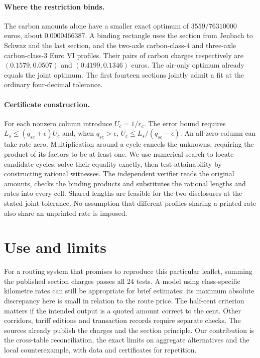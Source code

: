 \documentclass[11pt]{article}
\begin{document}
\paragraph{Where the restriction binds.}
The carbon amounts alone have a smaller exact optimum of $3559/76310000$ euros, about 0.0000466387. A binding rectangle uses the section from Jenbach to Schwaz and the last section, and the two-axle carbon-class-4 and three-axle carbon-class-3 Euro VI profiles. Their pairs of carbon charges respectively are $(0.1579,0.0507)$ and $(0.4199,0.1346)$ euros. The air-only optimum already equals the joint optimum. The first fourteen sections jointly admit a fit at the ordinary four-decimal tolerance.

\paragraph{Certificate construction.}
For each nonzero column introduce $U_c=1/r_c$. The error bound requires $L_s\leq(q_{sc}+\epsilon)U_c$ and, when $q_{sc}>\epsilon$, $U_c\leq L_s/(q_{sc}-\epsilon)$. An all-zero column can take rate zero. Multiplication around a cycle cancels the unknowns, requiring the product of its factors to be at least one. We use numerical search to locate candidate cycles, solve their equality exactly, then test attainability by constructing rational witnesses. The independent verifier reads the original amounts, checks the binding products and substitutes the rational lengths and rates into every cell. Shared lengths are feasible for the two disclosures at the stated joint tolerance. No assumption that different profiles sharing a printed rate also share an unprinted rate is imposed.
\section{Use and limits}
For a routing system that promises to reproduce this particular leaflet, summing the published section charges passes all 24 tests. A model using class-specific kilometre rates can still be appropriate for brief estimates: its maximum absolute discrepancy here is small in relation to the route price. The half-cent criterion matters if the intended output is a quoted amount correct to the cent. Other corridors, tariff editions and transaction records require separate checks. The sources already publish the charges and the section principle. Our contribution is the cross-table reconciliation, the exact limits on aggregate alternatives and the local counterexample, with data and certificates for repetition.
\end{document}

